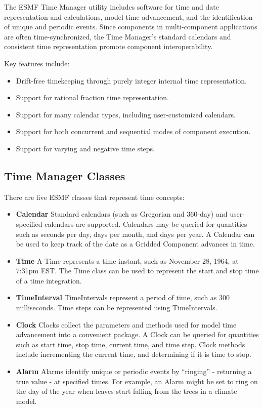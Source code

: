 
The ESMF Time Manager utility includes software for time and date 
representation and calculations, model time advancement, and the 
identification of unique and periodic events.  Since components
in multi-component applications are often time-synchronized, the 
Time Manager's standard calendars and consistent time representation 
promote component interoperability.  

Key features include:
\begin{itemize}
\item Drift-free timekeeping through purely integer internal time 
representation. 
\item Support for rational fraction time representation.
\item Support for many calendar types, including user-customized calendars.
\item Support for both concurrent and sequential modes of component execution.
\item Support for varying and negative time steps.
\end{itemize}

\subsection{Time Manager Classes}
There are five ESMF classes that represent time concepts:
\begin{itemize}
\item {\bf Calendar}  Standard calendars (such as Gregorian 
and 360-day) and user-specified calendars are supported.  
Calendars may be queried for quantities such as seconds per day, 
days per month, and days per year.  A Calendar can be 
used to keep track of the date as a Gridded Component advances 
in time. 
\item {\bf Time} A Time represents a time instant, such as 
November 28, 1964, at 7:31pm EST.  The Time class can be used 
to represent the start and stop time of a time integration.
\item {\bf TimeInterval} TimeIntervals represent a period 
of time, such as 300 milliseconds.  Time steps can be represented 
using TimeIntervals.  
\item {\bf Clock} Clocks collect the parameters and 
methods used for model time advancement into a convenient 
package.  A Clock can be queried for quantities such
as start time, stop time, current time, and time step.  Clock
methods include incrementing the current time, and determining
if it is time to stop.  
\item {\bf Alarm} Alarms identify unique or periodic events
by ``ringing'' - returning a true value - at specified times.  
For example, an Alarm might be set to ring on the day of the 
year when leaves start falling from the trees in a climate model.
\end{itemize}


